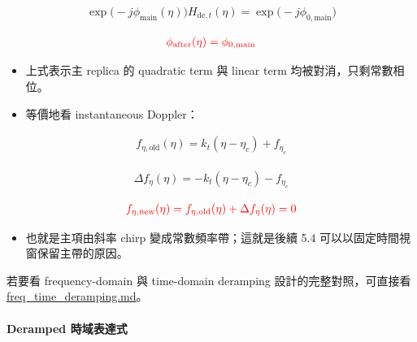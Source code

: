 \documentclass[11pt]{article}
\providecommand{\tightlist}{%
  \setlength{\itemsep}{0pt}\setlength{\parskip}{0pt}}
\begin{document}
\begin{equation}
\begin{aligned}
\exp\biggl( -j\phi_{\mathrm{main}}(\eta) \biggr)H_{\mathrm{de},t}(\eta)=\exp\biggl( -j\phi_{0,\mathrm{main}} \biggr)
\end{aligned}
\end{equation}

\begin{equation}
\begin{aligned}
{\color{red}{\phi_{\mathrm{after}}(\eta)=\phi_{0,\mathrm{main}}}}
\end{aligned}
\end{equation}

\begin{itemize}
\tightlist
\item
  上式表示主 replica 的 quadratic term 與 linear term
  均被對消，只剩常數相位。
\item
  等價地看 instantaneous Doppler：
\end{itemize}

\begin{equation}
\begin{aligned}
f_{\eta,\mathrm{old}}(\eta)=k_t(\eta-\eta_c)+f_{\eta_c}
\end{aligned}
\end{equation}

\begin{equation}
\begin{aligned}
\Delta f_\eta(\eta)=-k_t(\eta-\eta_c)-f_{\eta_c}
\end{aligned}
\end{equation}

\begin{equation}
\begin{aligned}
{\color{red}{f_{\eta,\mathrm{new}}(\eta)=f_{\eta,\mathrm{old}}(\eta)+\Delta f_\eta(\eta)=0}}
\end{aligned}
\end{equation}

\begin{itemize}
\tightlist
\item
  也就是主項由斜率 chirp 變成常數頻率帶；這就是後續 5.4
  可以以固定時間視窗保留主帶的原因。
\end{itemize}

若要看 frequency-domain 與 time-domain deramping
設計的完整對照，可直接看
\href{./freq_time_deramping.md}{freq\_time\_deramping.md}。

\hypertarget{deramped-ux6642ux57dfux8868ux9054ux5f0f}{%
\paragraph{Deramped
時域表達式}\label{deramped-ux6642ux57dfux8868ux9054ux5f0f}}
\end{document}
